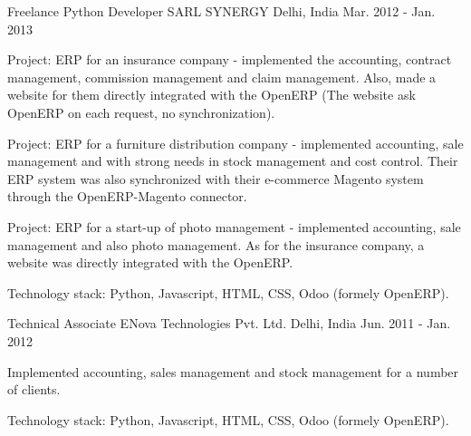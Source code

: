 \begin{cventries}
  \cventry
    {Freelance Python Developer} %
    {SARL SYNERGY} %
    {Delhi, India} %
    {Mar. 2012 - Jan. 2013} %
    {
      \begin{cvitems} %
        \item {Project: ERP for an insurance company - implemented the accounting, contract management, commission management and claim management. Also, made a website for them directly integrated with the OpenERP (The website ask OpenERP on each request, no synchronization).}
        \item {Project: ERP for a furniture distribution company - implemented accounting, sale management and with strong needs in stock management and cost control. Their ERP system was also synchronized with their e-commerce Magento system through the OpenERP-Magento connector.}
        \item {Project: ERP for a start-up of photo management - implemented accounting, sale management and also photo management. As for the insurance company, a website was directly integrated with the OpenERP.}
        \item {Technology stack: Python, Javascript, HTML, CSS, Odoo (formely OpenERP).}
      \end{cvitems}
    }

  \cventry
    {Technical Associate} %
    {ENova Technologies Pvt. Ltd.} %
    {Delhi, India} %
    {Jun. 2011 - Jan. 2012} %
    {
      \begin{cvitems} %
        \item {Implemented accounting, sales management and stock management for a number of clients.}
        \item {Technology stack: Python, Javascript, HTML, CSS, Odoo (formely OpenERP).}
      \end{cvitems}
    }

\end{cventries}

